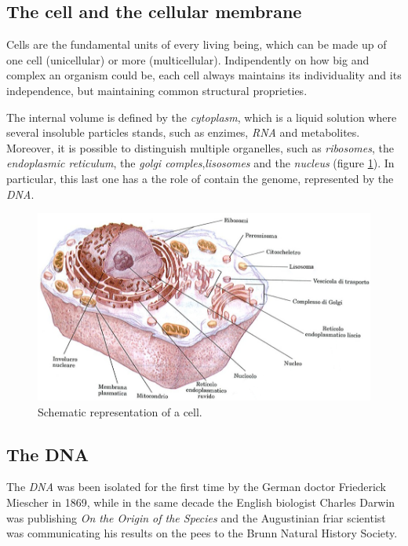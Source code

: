 \subsection{The cell and the cellular membrane}
\label{sec:cell}
Cells are the fundamental units of every living being, which can be made up of one cell (unicellular) or more (multicellular).
Indipendently on how big and complex an organism could be, each cell always maintains its individuality and its independence, but maintaining common structural proprieties.

The internal volume is defined by the \textit{cytoplasm}, which is a liquid solution where several insoluble particles stands, such as enzimes, \textit{RNA} and metabolites.
Moreover, it is possible to distinguish multiple organelles, such as \textit{ribosomes}, the \textit{endoplasmic reticulum}, the \textit{golgi comples},\textit{lisosomes} and the \textit{nucleus} (figure \ref{fig:cell}).
In particular, this last one has a the role of contain the genome, represented by the \textit{DNA}.

\begin{figure}[H]
\centering
\includegraphics[width=\textwidth, keepaspectratio]{img/intro/cell.png}
\caption[The Cell]{Schematic representation of a cell.}
\label{fig:cell}
\end{figure}

\subsection{The DNA}
\label{sec:genica}
The \textit{DNA} was been isolated for the first time by the German doctor Friederick Miescher in 1869, while in the same decade the English biologist Charles Darwin was publishing \textit{On the Origin of the Species} and the  Augustinian friar scientist was communicating his results on the pees to the Brunn Natural History Society.


